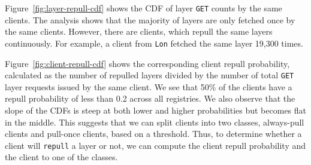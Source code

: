 Figure~\ref{fig:layer-repull-cdf} shows the
CDF of layer \texttt{GET} counts by the same clients. 
%
The analysis shows that the majority of layers are only fetched once by the same clients.
%
However, there are clients, which repull the same layers continuously.  For
example, a client from \texttt{Lon} fetched the same layer 19,300 times.

%
Figure~\ref{fig:client-repull-cdf} shows the corresponding client repull probability,
calculated as the number of repulled layers divided by the
number of total \texttt{GET} layer requests issued by the same client.
%
We see that 50\% of the clients have a repull probability of less than 0.2
across all registries.
%
We also observe that the slope of the CDFs is steep at both lower and higher probabilities
but becomes flat in the middle.
%
This suggests that we can split clients into two classes, always-pull clients
and pull-once clients, based on a threshold.
%
Thus, to determine whether a client will \texttt{repull} a layer or not, we
can compute the client repull probability and the client to one of the classes.
%
%
%


